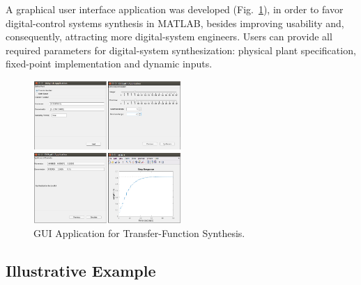 \documentclass[sigconf]{acmart}
\begin{document}
A graphical user interface application was developed (Fig.~\ref{fig:gui-for-tf}), in order to favor digital-control systems synthesis in MATLAB, besides improving usability and, consequently, attracting more digital-system engineers. Users can provide all required parameters for digital-system synthesization: physical plant specification, fixed-point implementation and dynamic inputs. 
%
\begin{figure}
  \includegraphics[width=0.5\textwidth]{screens_dssynth.png}
  \caption{GUI Application for Transfer-Function Synthesis.}
  \label{fig:gui-for-tf}
\end{figure}


\subsection{Illustrative Example}
\end{document}
